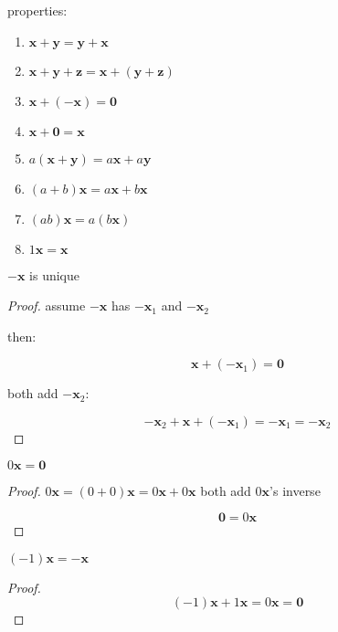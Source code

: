 \begin{definition}
properties:

\begin{enumerate}
    \item $\mathbf{x} + \mathbf{y} = \mathbf{y} + \mathbf{x}$
    \item $\mathbf{x} + \mathbf{y} + \mathbf{z} = \mathbf{x} + (\mathbf{y} + \mathbf{z})$
    \item $\mathbf{x} + (-\mathbf{x}) = \mathbf{0}$
    \item $\mathbf{x} + \mathbf{0} = \mathbf{x}$
    \item $a(\mathbf{x}+\mathbf{y}) = a\mathbf{x} + a\mathbf{y}$
    \item $(a+b)\mathbf{x} = a\mathbf{x} + b\mathbf{x}$
    \item $(ab)\mathbf{x} = a(b\mathbf{x})$
    \item $1\mathbf{x} = \mathbf{x}$
\end{enumerate}
\end{definition}


\begin{exercise}
$-\mathbf{x}$ is unique
\end{exercise}

\begin{proof}
assume $-\mathbf{x}$ has  $-\mathbf{x}_1$  and $-\mathbf{x}_2$

then:

\[
    \mathbf{x} + (-\mathbf{x}_1) = \mathbf{0}
\]

both add $-\mathbf{x}_2$:

\[
    -\mathbf{x}_2 + \mathbf{x} + (-\mathbf{x}_1) = -\mathbf{x}_1 = -\mathbf{x}_2
\]
\end{proof}


\begin{exercise}
$0 \mathbf{x} = \mathbf{0}$
\end{exercise}

\begin{proof}
    $0\mathbf{x} = (0+0)\mathbf{x} = 0\mathbf{x} + 0\mathbf{x}$ 
    both add $0\mathbf{x}$'s inverse

    \[
        \mathbf{0} = 0 \mathbf{x}
    \]
\end{proof}




\begin{exercise}
$(-1) \mathbf{x} = -\mathbf{x}$
\end{exercise}

\begin{proof}
\[
    (-1)\mathbf{x} + 1 \mathbf{x} = 0\mathbf{x} = \mathbf{0}
\]
\end{proof}


